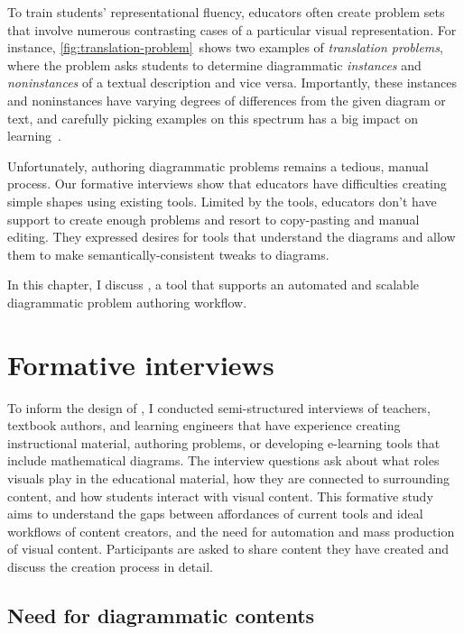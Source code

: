 To train students' representational fluency, educators often create problem sets that involve numerous contrasting cases of a particular visual representation. For instance, \cref{fig:translation-problem}~shows two examples of \emph{translation problems}, where the problem asks students to determine diagrammatic \emph{instances} and \emph{noninstances} of a textual description and vice versa. Importantly, these instances and noninstances have varying degrees of differences from the given diagram or text, and carefully picking examples on this spectrum has a big impact on learning~\cite{samenessAndDifference}.

Unfortunately, authoring diagrammatic problems remains a tedious, manual process. Our formative interviews show that educators have difficulties creating simple shapes using existing tools. Limited by the tools, educators don't have support to create enough problems and resort to copy-pasting and manual editing. They expressed desires for tools that understand the diagrams and allow them to make semantically-consistent tweaks to diagrams.

In this chapter, I discuss \Edgeworth, a tool that supports an automated and scalable diagrammatic problem authoring workflow. 

\section{Formative interviews}
\label{sec:edgeworth-formative}

To inform the design of \Edgeworth, I conducted semi-structured interviews of teachers, textbook authors, and learning engineers that have experience creating instructional material, authoring problems, or developing e-learning tools that include mathematical diagrams. The interview questions ask about what roles visuals play in the educational material, how they are connected to surrounding content, and how students interact with visual content. This formative study aims to understand the gaps between affordances of current tools and ideal workflows of content creators, and the need for automation and mass production of visual content. Participants are asked to share content they have created and discuss the creation process in detail.

\subsection{Need for diagrammatic contents}

